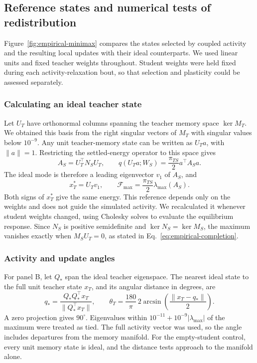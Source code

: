 \documentclass[10pt,letterpaper]{article}
\theoremstyle{plain}
\theoremstyle{remark}
\begin{document}
\subsection{Reference states and numerical tests of redistribution}
\label{sec:methods-redistribution-tests}

Figure~\ref{fig:empirical-minimax} compares the states selected by coupled activity and the resulting local updates with their ideal counterparts. We used linear units and fixed teacher weights throughout. Student weights were held fixed during each activity-relaxation bout, so that selection and plasticity could be assessed separately.

\subsubsection{Calculating an ideal teacher state}
\label{sec:methods-ideal-teacher}

Let \(U_T\) have orthonormal columns spanning the teacher memory space \(\ker M_T\). We obtained this basis from the right singular vectors of \(M_T\) with singular values below \(10^{-9}\). Any unit teacher-memory state can be written as \(U_Ta\), with \(\|a\|=1\). Restricting the settled-energy operator to this space gives
\begin{equation}
A_S=U_T^\top N_SU_T,\qquad
q(U_Ta;W_S)=\frac{\pi_{TS}}{2}a^\top A_Sa.
\label{eq:empirical-restricted-novelty}
\end{equation}
The ideal mode is therefore a leading eigenvector \(v_1\) of \(A_S\), and
\begin{equation}
x_T^*=U_Tv_1,\qquad
\mathcal F_{\max}=\frac{\pi_{TS}}{2}\lambda_{\max}(A_S).
\label{eq:empirical-spectral-benchmark}
\end{equation}
Both signs of \(x_T^*\) give the same energy. This reference depends only on the weights and does not guide the simulated activity. We recalculated it whenever student weights changed, using Cholesky solves to evaluate the equilibrium response. Since \(N_S\) is positive semidefinite and \(\ker N_S=\ker M_S\), the maximum vanishes exactly when \(M_SU_T=0\), as stated in Eq.~\eqref{eq:empirical-completion}.

\subsubsection{Activity and update angles}
\label{sec:methods-teacher-distance}

For panel B, let \(Q_*\) span the ideal teacher eigenspace. The nearest ideal state to the full unit teacher state \(x_T\), and its angular distance in degrees, are
\begin{equation}
q_* = \frac{Q_*Q_*^\top x_T}{\|Q_*^\top x_T\|},\qquad
\theta_T=\frac{180}{\pi}\,2\arcsin\!\left(\frac{\|x_T-q_*\|}{2}\right).
\label{eq:empirical-teacher-distance}
\end{equation}
A zero projection gives \(90^\circ\). Eigenvalues within \(10^{-11}+10^{-9}|\lambda_{\max}|\) of the maximum were treated as tied. The full activity vector was used, so the angle includes departures from the memory manifold. For the empty-student control, every unit memory state is ideal, and the distance tests approach to the manifold alone.
\end{document}
